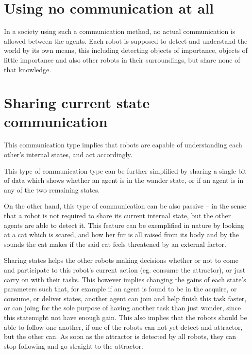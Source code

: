 \documentclass[12pt]{report}
\begin{document}
\section{Using no communication at all}

In a society using such a communication method, no actual communication is allowed between the agents. Each robot is supposed to detect and understand the world by its own means, this including detecting objects of importance, objects of little importance and also other robots in their surroundings, but share none of that knowledge.


\section{Sharing current state communication}

This communication type implies that robots are capable of understanding each other's  internal states, and act accordingly. 

This type of communication type can be further simplified by sharing a single bit of data which shows whether an agent is in the wander state, or if an agent is in any of the two remaining states.

On the other hand, this type of communication can be also passive -- in the sense that a robot is not required to share its current internal state, but the other agents are able to detect it. This feature can be exemplified in nature by looking at a cat which is scared, and how her fur is all raised from its body and by the sounds the cat makes if the said cat feels threatened by an external factor.

Sharing states helps the other robots making decisions whether or not to come and participate to this robot's current action (eg. consume the attractor), or just carry on with their tasks. This however implies changing the gains of each state's parameters such that, for example if an agent is found to be in the acquire, or consume, or deliver states, another agent can join and help finish this task faster, or can joing for the sole purpose of having another task than just wonder, since this statemight not have enough gain. This also implies that the robots should be able to follow one another, if one of the robots can not yet detect and attractor, but the other can. As soon as the attractor is detected by all robots, they can stop following and go straight to the attractor.
\end{document}
